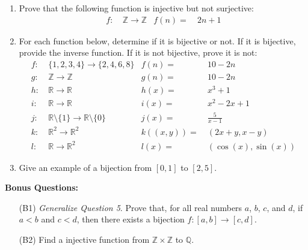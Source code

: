 \documentclass{article}
\begin{document}
\begin{enumerate}
            \begin{proof}  
                \begin{caseof}
                \end{caseof}
            \end{proof}

	\item Prove that the following function is injective but not surjective:
		  \begin{align*}
			f : & \ \mathbb{Z} \rightarrow \mathbb{Z} & f(n) = & \ 2n+1
		  \end{align*}

	\item For each function below, determine if it is bijective or not.  If it is bijective, provide the inverse function.  If it is not bijective, prove it is not:
		  \begin{align*}
			f : & \ \{ 1, 2, 3, 4 \} \rightarrow \{ 2, 4, 6, 8 \} & f(n) = & \ 10 - 2n \\
			g : & \ \mathbb{Z} \rightarrow \mathbb{Z} & g(n) = & \ 10 - 2n \\
			h : & \ \mathbb{R} \rightarrow \mathbb{R} & h(x) = & \ x^3 + 1 \\
			i : & \ \mathbb{R} \rightarrow \mathbb{R} & i(x) = & \ x^2 - 2x + 1 \\
			j : & \ \mathbb{R} \setminus \{ 1 \} \rightarrow \mathbb{R} \setminus \{ 0 \} & j(x) = & \ \frac{5}{x-1} \\
			k : & \ \mathbb{R}^2 \rightarrow \mathbb{R}^2 & k((x,y)) = & \ (2x+y, x-y) \\
			l : & \ \mathbb{R} \rightarrow \mathbb{R}^2 & l(x) = & \ (\cos(x), \sin(x))
		  \end{align*}

	\item Give an example of a bijection from $[0,1]$ to $[2,5]$.
    \end{enumerate}

    \newpage
    \textbf{Bonus Questions:}

    \begin{itemize}

	\item [(B1)] \textit{Generalize Question 5}. Prove that, for all real numbers $a$, $b$, $c$, and $d$, if $a < b$ and $c < d$, then there exists a bijection $f : [a,b]     \rightarrow [c,d]$.

	\item [(B2)] Find a injective function from $\mathbb{Z} \times \mathbb{Z}$ to $\mathbb{Q}$.
    \end{itemize}
\end{document}
